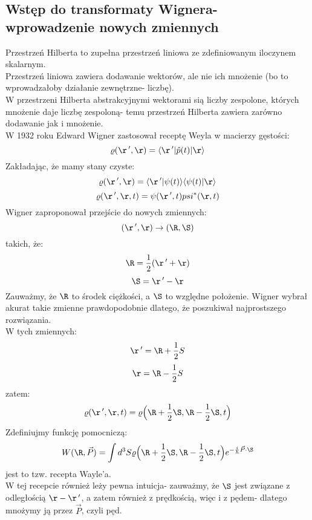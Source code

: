 \subsection{Wstęp do transformaty Wignera- wprowadzenie nowych zmiennych}
Przestrzeń Hilberta to zupełna przestrzeń liniowa ze zdefiniowanym iloczynem skalarnym.\\
Przestrzeń liniowa zawiera dodawanie wektorów, ale nie ich mnożenie (bo to wprowadzałoby działanie zewnętrzne- liczbę).\\
W przestrzeni Hilberta abstrakcyjnymi wektorami sią liczby zespolone, których mnożenie daje liczbę zespoloną- temu przestrzeń Hilberta zawiera zarówno dodawanie jak i mnożenie.\\
W 1932 roku Edward Wigner zastosował receptę Weyla w macierzy gęstości:
\begin{equation}\varrho(\r\,',\r)=\langle\r\,'|\hat{p}(t)|\r\rangle\end{equation}
Zakładając, że mamy stany czyste:
\begin{equation}\varrho(\r\,',\r)=
\langle\r\,'|\psi(t)\rangle\langle\psi(t)|\r\rangle\end{equation}
\begin{equation}\varrho(\r\,',\r,t)=\psi(\r\,',t)psi^*(\r,t)\end{equation}
Wigner zaproponował przejście do nowych zmiennych:
\begin{equation}(\r\,',\r)\rightarrow(\R,\S)\end{equation}
takich, że:
\begin{equation}\R=\frac{1}{2}(\r\,'+\r)\end{equation}
\begin{equation}\S=\r\,'-\r\end{equation}
Zauważmy, że $\R$ to środek ciężkości, a $\S$ to względne położenie.
Wigner wybrał akurat takie zmienne prawdopodobnie dlatego, że poszukiwał najprostszego rozwiązania.\\
W tych zmiennych:
\begin{equation}\r\,'=\R+\frac{1}{2}S\end{equation}
\begin{equation}\r=\R-\frac{1}{2}S\end{equation}
zatem:
\begin{equation}\varrho(\r\,',\r,t)=\varrho\Big(\R+\frac{1}{2}\S,\R-\frac{1}{2}\S,t\Big)\end{equation}
Zdefiniujmy funkcję pomocniczą:
\begin{equation}
W(\R,\vec{P})=\int d^3S\varrho\Big(\R+\frac{1}{2}\S,\R-\frac{1}{2}\S,t\Big)e^{-\frac{i}{\hbar}\vec{P}\cdot\S}
\end{equation}
jest to tzw. recepta Wayle'a.\\
W tej recepcie również leży pewna intuicja- zauważmy, że $\S$ jest związane z odległością $\r-\r\,'$, a zatem również z prędkością, więc i z pędem- dlatego mnożymy ją przez $\vec{P}$, czyli pęd.
